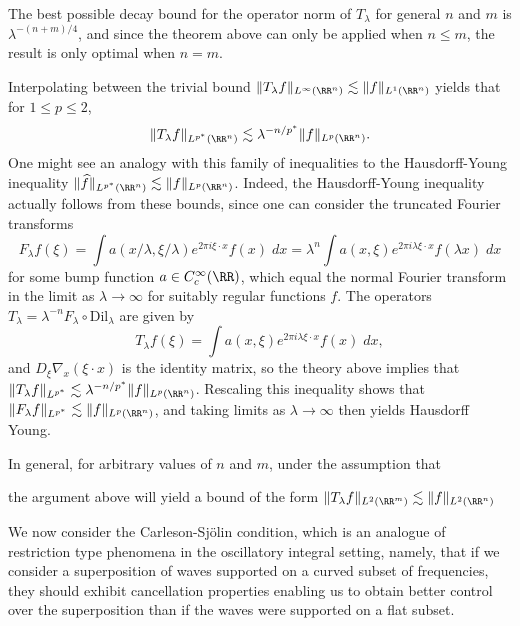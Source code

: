 \begin{remark}
    The best possible decay bound for the operator norm of $T_\lambda$ for general $n$ and $m$ is $\lambda^{-(n+m)/4}$, and since the theorem above can only be applied when $n \leq m$, the result is only optimal when $n = m$.
\end{remark}

Interpolating between the trivial bound $\| T_\lambda f \|_{L^\infty(\RR^n)} \lesssim \| f \|_{L^1(\RR^n)}$ yields that for $1 \leq p \leq 2$,
%
\[ \| T_\lambda f \|_{L^{p^*}(\RR^n)} \lesssim \lambda^{-n/p^*} \| f \|_{L^p(\RR^n)}. \]
%
One might see an analogy with this family of inequalities to the Hausdorff-Young inequality $\| \widehat{f} \|_{L^{p^*}(\RR^n)} \lesssim \| f \|_{L^p(\RR^n)}$. Indeed, the Hausdorff-Young inequality actually follows from these bounds, since one can consider the truncated Fourier transforms
%
\[ F_\lambda f(\xi) = \int a(x/\lambda,\xi/\lambda) e^{2 \pi i \xi \cdot x} f(x)\; dx = \lambda^n \int a(x,\xi) e^{2 \pi i \lambda \xi \cdot x} f(\lambda x)\; dx \]
%
for some bump function $a \in C_c^\infty(\RR)$, which equal the normal Fourier transform in the limit as $\lambda \to \infty$ for suitably regular functions $f$. The operators $T_\lambda = \lambda^{-n} F_\lambda \circ \text{Dil}_\lambda$ are given by
%
\[ T_\lambda f(\xi) = \int a(x,\xi) e^{2 \pi i \lambda \xi \cdot x} f(x)\; dx, \]
%
and $D_\xi \nabla_x(\xi \cdot x)$ is the identity matrix, so the theory above implies that $\| T_\lambda f \|_{L^{p^*}} \lesssim \lambda^{-n/p^*} \| f \|_{L^p(\RR^n)}$. Rescaling this inequality shows that $\| F_\lambda f \|_{L^{p^*}} \lesssim \| f \|_{L^p(\RR^n)}$, and taking limits as $\lambda \to \infty$ then yields Hausdorff Young.

In general, for arbitrary values of $n$ and $m$, under the assumption that

 the argument above will yield a bound of the form $\| T_\lambda f \|_{L^2(\RR^m)} \lesssim \| f \|_{L^2(\RR^n)}$

We now consider the Carleson-Sj\"{o}lin condition, which is an analogue of restriction type phenomena in the oscillatory integral setting, namely, that if we consider a superposition of waves supported on a curved subset of frequencies, they should exhibit cancellation properties enabling us to obtain better control over the superposition than if the waves were supported on a flat subset.








